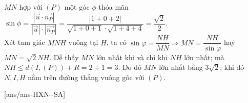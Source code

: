 \begin{ex}
{\begin{enumerate}
\begin{center}
			      \end{center}
			      $MN$ hợp với $(P)$ một góc $\phi$ thỏa mãn $\sin \phi = \dfrac{|\vec{u}\cdot\vec{n_P}|}{|\vec{u}|\cdot|\vec{n_P}|} = \dfrac{|1+0+2|}{\sqrt{1+0+1}\cdot\sqrt{1+4+4}} = \dfrac{\sqrt{2}}{2}$.\\
			      Xét tam giác $MNH$ vuông tại $H$, ta có
			      $\sin \varphi = \dfrac{NH}{MN} \Rightarrow MN = \dfrac{NH}{\sin \varphi}$ hay $\boxed{MN = \sqrt{2}NH}$.
			      Dễ thấy $MN$ lớn nhất khi và chỉ khi $NH$ lớn nhất; mà
			      $NH \le d(I, (P)) + R = 2+1=3$.
			      Do đó $MN$ lớn nhất bằng $\boxed{3\sqrt{2}}$; khi đó $N, I, H$ nằm trên đường thẳng vuông góc với $(P)$.
		\end{enumerate}
	}
\end{ex}

\caukq
{}[ans/ans-HXN-\sode-SA]



